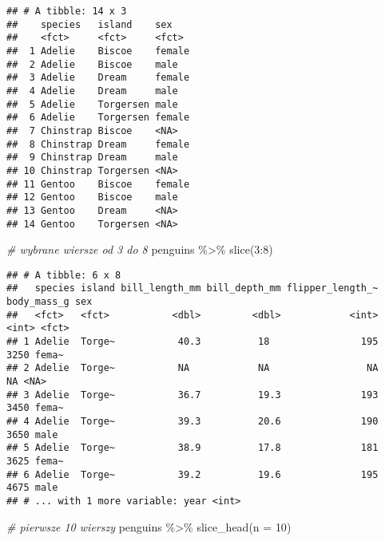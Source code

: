 \documentclass[
]{book}
\newenvironment{Shaded}{\begin{snugshade}}{\end{snugshade}}
\newcommand{\AttributeTok}[1]{\textcolor[rgb]{0.77,0.63,0.00}{#1}}
\newcommand{\CommentTok}[1]{\textcolor[rgb]{0.56,0.35,0.01}{\textit{#1}}}
\newcommand{\DecValTok}[1]{\textcolor[rgb]{0.00,0.00,0.81}{#1}}
\newcommand{\FunctionTok}[1]{\textcolor[rgb]{0.00,0.00,0.00}{#1}}
\newcommand{\NormalTok}[1]{#1}
\newcommand{\SpecialCharTok}[1]{\textcolor[rgb]{0.00,0.00,0.00}{#1}}
\begin{document}
\begin{verbatim}
## # A tibble: 14 x 3
##    species   island    sex   
##    <fct>     <fct>     <fct> 
##  1 Adelie    Biscoe    female
##  2 Adelie    Biscoe    male  
##  3 Adelie    Dream     female
##  4 Adelie    Dream     male  
##  5 Adelie    Torgersen male  
##  6 Adelie    Torgersen female
##  7 Chinstrap Biscoe    <NA>  
##  8 Chinstrap Dream     female
##  9 Chinstrap Dream     male  
## 10 Chinstrap Torgersen <NA>  
## 11 Gentoo    Biscoe    female
## 12 Gentoo    Biscoe    male  
## 13 Gentoo    Dream     <NA>  
## 14 Gentoo    Torgersen <NA>
\end{verbatim}

\begin{Shaded}
\begin{Highlighting}[]
\CommentTok{\# wybrane wiersze od 3 do 8}
\NormalTok{penguins }\SpecialCharTok{\%\textgreater{}\%} \FunctionTok{slice}\NormalTok{(}\DecValTok{3}\SpecialCharTok{:}\DecValTok{8}\NormalTok{)}
\end{Highlighting}
\end{Shaded}

\begin{verbatim}
## # A tibble: 6 x 8
##   species island bill_length_mm bill_depth_mm flipper_length_~ body_mass_g sex  
##   <fct>   <fct>           <dbl>         <dbl>            <int>       <int> <fct>
## 1 Adelie  Torge~           40.3          18                195        3250 fema~
## 2 Adelie  Torge~           NA            NA                 NA          NA <NA> 
## 3 Adelie  Torge~           36.7          19.3              193        3450 fema~
## 4 Adelie  Torge~           39.3          20.6              190        3650 male 
## 5 Adelie  Torge~           38.9          17.8              181        3625 fema~
## 6 Adelie  Torge~           39.2          19.6              195        4675 male 
## # ... with 1 more variable: year <int>
\end{verbatim}

\begin{Shaded}
\begin{Highlighting}[]
\CommentTok{\# pierwsze 10 wierszy }
\NormalTok{penguins }\SpecialCharTok{\%\textgreater{}\%} \FunctionTok{slice\_head}\NormalTok{(}\AttributeTok{n =} \DecValTok{10}\NormalTok{)}
\end{Highlighting}
\end{Shaded}
\end{document}
